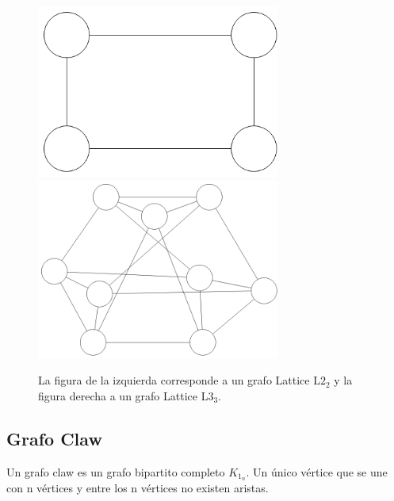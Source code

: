 \begin{figure}[H]
\includegraphics[width=80mm]{L2_2.png}
\includegraphics[width=80mm]{L3_3.png}
\caption{La figura de la izquierda corresponde a un grafo Lattice L$2_2$ y la figura derecha a un grafo Lattice L$3_3$.}
\label{overflow}
\end{figure}

\subsection{Grafo Claw}
Un grafo claw es un grafo bipartito completo $K_1_n$. Un único vértice que se une con n vértices y entre los n vértices no existen aristas.

